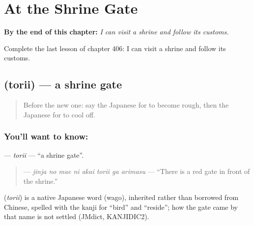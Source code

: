 
\chapter{At the Shrine Gate}
\label{ch:ja-at-the-shrine-gate}

\begin{chapteropening}
\textbf{By the end of this chapter:} \emph{I can visit a shrine and follow its customs.}

Complete the last lesson of chapter 406: I can visit a shrine and follow its customs.
\end{chapteropening}

\section[\texorpdfstring{\ja{とりい} (torii)}{とりい (torii)}]{ (torii) — a shrine gate}

\label{lesson:JA-C406-torii}



\begin{quote}
Before the new one: say the Japanese for to become rough, then the Japanese for to cool off.
\end{quote}

\subsection*{You'll want to know: }
\textbf{} — \emph{torii} — \textquotedblleft{}a shrine gate\textquotedblright{}.

\begin{quote}
\textbf{    } — \emph{jinja no mae ni akai torii ga arimasu} — \textquotedblleft{}There is a red gate in front of the shrine.\textquotedblright{}
\end{quote}

\begin{cousinweb}
\textbf{} (\emph{torii}) is a native Japanese word (wago), inherited rather than borrowed from Chinese, spelled with the kanji for \textquotedblleft{}bird\textquotedblright{} and \textquotedblleft{}reside\textquotedblright{}; how the gate came by that name is not settled (JMdict, KANJIDIC2).
\end{cousinweb}

